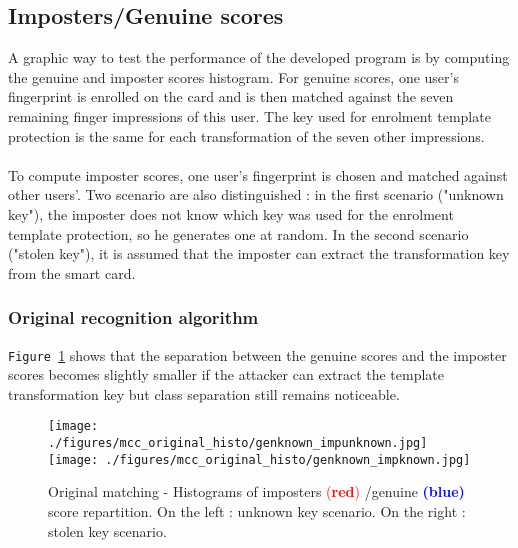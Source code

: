 \documentclass[a4paper,12pt]{article}
\begin{document}
\subsection{Imposters/Genuine scores}
A graphic way to test the performance of the developed program is by computing the genuine and imposter scores histogram. For genuine scores, one user's fingerprint is enrolled on the card and is then matched against the seven remaining finger impressions of this user. The key used for enrolment template protection is the same for each transformation of the seven other impressions.\\\\
To compute imposter scores, one user's fingerprint is chosen and matched against other users'. Two scenario are also distinguished : in the first scenario ("unknown key"), the imposter does not know which key was used for the enrolment template protection, so he generates one at random. In the second scenario ("stolen key"), it is assumed that the imposter can extract the transformation key from the smart card.

\subsubsection{Original recognition algorithm}
\texttt{Figure \ref{tab:original_genuine}} shows that the separation between the genuine scores and the imposter scores becomes slightly smaller if the attacker can extract the template transformation key but class separation still remains noticeable.

\begin{figure}[!htbp]
\centering
  \texttt{[image: ./figures/mcc\_original\_histo/genknown\_impunknown.jpg]}
  \texttt{[image: ./figures/mcc\_original\_histo/genknown\_impknown.jpg]}\\
  
\caption{Original matching - Histograms of imposters \textcolor{red}{(\textbf{red})} /genuine \textcolor{blue}{\textbf{(blue)}} score repartition.
On the left : unknown key scenario.
On the right : stolen key scenario.}
\label{tab:original_genuine}
\end{figure}
\FloatBarrier
\end{document}
